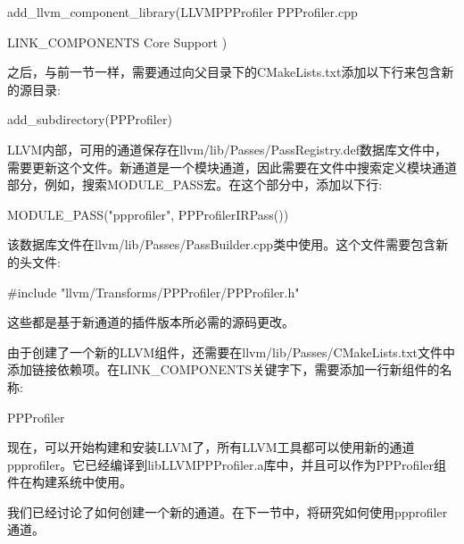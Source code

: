 \begin{cmake}
add_llvm_component_library(LLVMPPProfiler
    PPProfiler.cpp

    LINK_COMPONENTS
    Core
    Support
)
\end{cmake}

之后，与前一节一样，需要通过向父目录下的CMakeLists.txt添加以下行来包含新的源目录:

\begin{cmake}
add_subdirectory(PPProfiler)
\end{cmake}

LLVM内部，可用的通道保存在llvm/lib/Passes/PassRegistry.def数据库文件中，需要更新这个文件。新通道是一个模块通道，因此需要在文件中搜索定义模块通道部分，例如，搜索MODULE\_PASS宏。在这个部分中，添加以下行:

\begin{shell}
MODULE_PASS("ppprofiler", PPProfilerIRPass())
\end{shell}

该数据库文件在llvm/lib/Passes/PassBuilder.cpp类中使用。这个文件需要包含新的头文件:

\begin{cpp}
#include "llvm/Transforms/PPProfiler/PPProfiler.h"
\end{cpp}

这些都是基于新通道的插件版本所必需的源码更改。

由于创建了一个新的LLVM组件，还需要在llvm/lib/Passes/CMakeLists.txt文件中添加链接依赖项。在LINK\_COMPONENTS关键字下，需要添加一行新组件的名称:

\begin{shell}
PPProfiler
\end{shell}

现在，可以开始构建和安装LLVM了，所有LLVM工具都可以使用新的通道ppprofiler。它已经编译到libLLVMPPProfiler.a库中，并且可以作为PPProfiler组件在构建系统中使用。

我们已经讨论了如何创建一个新的通道。在下一节中，将研究如何使用ppprofiler通道。









